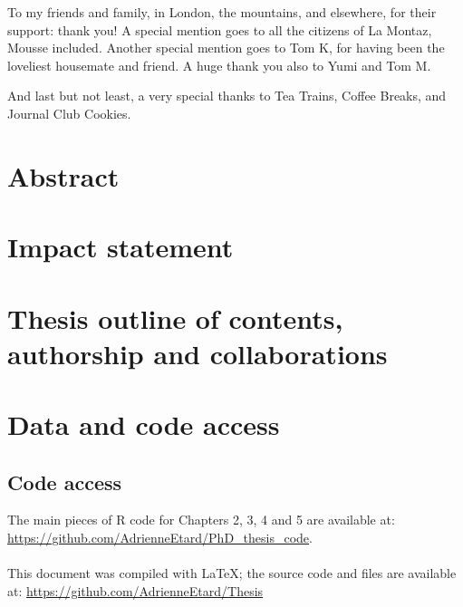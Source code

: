 \documentclass[11pt]{report}
\begin{document}
\begin{refsection}
To my friends and family, in London, the mountains, and elsewhere, for their support: thank you! A special mention goes to all the citizens of La Montaz, Mousse included. Another special mention goes to Tom K, for having been the loveliest housemate and friend. A huge thank you also to Yumi and Tom M.

And last but not least, a very special thanks to Tea Trains, Coffee Breaks, and Journal Club Cookies.



\clearpage

\chapter*{Abstract} %


\clearpage
\chapter*{Impact statement}%


\clearpage
\chapter*{Thesis outline of contents, authorship and collaborations}


\clearpage
\chapter*{Data and code access}

\section*{Code access}
The main pieces of R code for Chapters 2, 3, 4 and 5 are available at: \url{https://github.com/AdrienneEtard/PhD_thesis_code}.\\
\\
This document was compiled with {\LaTeX}; the source code and files are available at: \url{https://github.com/AdrienneEtard/Thesis}


\end{refsection}
\end{document}
